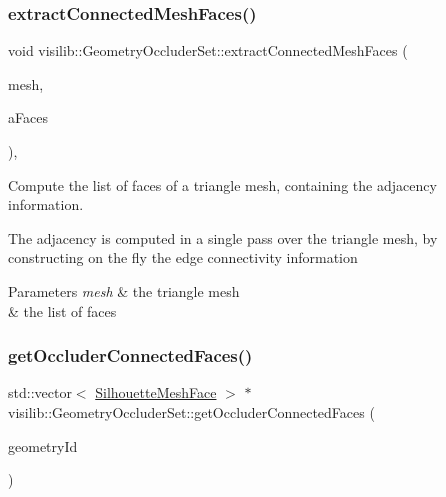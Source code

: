 \subsubsection{\texorpdfstring{extractConnectedMeshFaces()}{extractConnectedMeshFaces()}}
{\footnotesize\ttfamily void visilib\+::\+Geometry\+Occluder\+Set\+::extract\+Connected\+Mesh\+Faces (\begin{DoxyParamCaption}\item[{\mbox{\hyperlink{structvisilib_1_1_discrete_geometry_description}{Discrete\+Geometry\+Description}} $\ast$}]{mesh,  }\item[{std\+::vector$<$ \mbox{\hyperlink{classvisilib_1_1_silhouette_mesh_face}{Silhouette\+Mesh\+Face}} $>$ \&}]{a\+Faces }\end{DoxyParamCaption})\hspace{0.3cm}{\ttfamily [inline]}, {\ttfamily [private]}}



Compute the list of faces of a triangle mesh, containing the adjacency information. 

The adjacency is computed in a single pass over the triangle mesh, by constructing on the fly the edge connectivity information


\begin{DoxyParams}{Parameters}
{\em mesh} & the triangle mesh \\
\hline
{\em } & the list of faces \\
\hline
\end{DoxyParams}
\mbox{\label{classvisilib_1_1_geometry_occluder_set_a48bcbc4a98511777faf8fa006343d6a3}} 
\subsubsection{\texorpdfstring{getOccluderConnectedFaces()}{getOccluderConnectedFaces()}}
{\footnotesize\ttfamily std\+::vector$<$ \mbox{\hyperlink{classvisilib_1_1_silhouette_mesh_face}{Silhouette\+Mesh\+Face}} $>$ $\ast$ visilib\+::\+Geometry\+Occluder\+Set\+::get\+Occluder\+Connected\+Faces (\begin{DoxyParamCaption}\item[{size\+\_\+t}]{geometry\+Id }\end{DoxyParamCaption})\hspace{0.3cm}{\ttfamily [inline]}}



